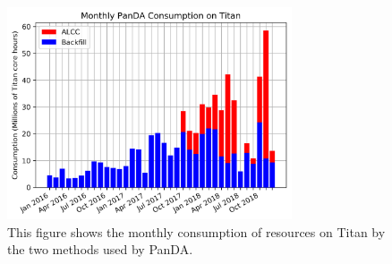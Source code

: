 \begin{figure}
  \includegraphics[width=0.75\textwidth]{images/monthly-consumption.png}
\caption{This figure shows the monthly consumption of resources on Titan by the
two methods used by PanDA.}
\label{fig:monthly-consumption}
\end{figure}


